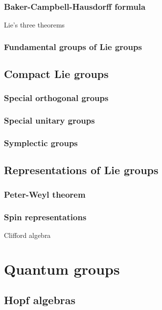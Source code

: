 \documentclass{../note}
\begin{document}
\section{Baker-Campbell-Hausdorff formula}
Lie's three theorems
\section{Fundamental groups of Lie groups}

\chapter{Compact Lie groups}
\section{Special orthogonal groups}
\section{Special unitary groups}
\section{Symplectic groups}

\chapter{Representations of Lie groups}
\section{Peter-Weyl theorem}
\section{Spin representations}
Clifford algebra



\part{Quantum groups}
\chapter{Hopf algebras}
\chapter{}
\end{document}
